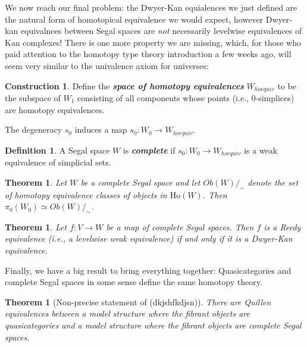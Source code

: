 \documentclass{article}
\newcommand{\textbi}[1]{\textbf{\textit{#1}}}
\newcommand{\Ho}{\mathrm{Ho}}
\newtheorem{thm}[subsection]{Theorem}
\theoremstyle{definition}
\newtheorem{defin}[subsection]{Definition}
\newtheorem{cons}[subsection]{Construction}
\begin{document}
We now reach our final problem: the Dwyer-Kan equialences we just defined are the natural form of homotopical equivalence we would expect, however Dwyer-kan equivalnces between Segal spaces are \textit{not} necessarily levelwise equivalences of Kan complexes! There is one more property we are missing, which, for those who paid attention to the homotopy type theory introduction a few weeks ago, will seem very similar to the univalence axiom for universes:

\begin{cons}
    \par Define the \textbi{space of homotopy equivalences} $W_{hoequiv}$ to be the subspace of $W_1$ consisting of all components whose points (i.e., 0-simplices) are homotopy equivalences. 
\par The degeneracy $s_0$ induces a map $s_0:W_0\to W_{hoequiv}$.
\end{cons}

\begin{defin}
    A Segal space $W$ is \textbi{complete} if $s_0:W_0\to W_{hoequiv}$ is a weak equivalence of simplicial sets.
\end{defin}

\begin{thm}
    Let $W$ be a complete Segal space and let $Ob(W)/_\sim$ denote the set of homotopy equivalence classes of objects in $\Ho(W)$. Then $\pi_0(W_0)\simeq Ob(W)/_\sim$.
\end{thm}

\begin{thm}
    Let $f:V \to W$ be a map of complete Segal spaces. Then $f$ is a Reedy equivalence (i.e., a levelwise weak equivalence) if and only if it is a Dwyer-Kan equivalence.
\end{thm}

Finally, we have a big result to bring everything together: Quasicategories and complete Segal spaces in some sense define the same homotopy theory.

\begin{thm}[Non-precise statement of (dkjshfkdjsn)]
    There are Quillen equivalences between a model structure where the fibrant objects are quasicategories and a model structure where the fibrant objects are complete Segal spaces.
\end{thm}
\end{document}
